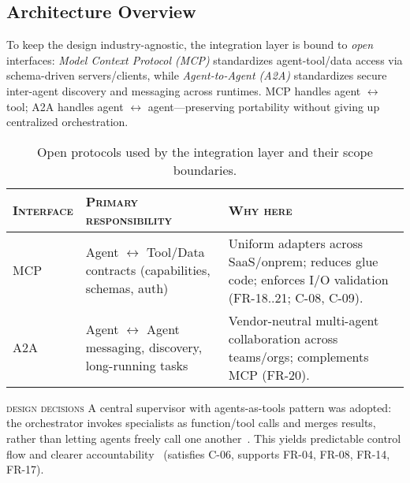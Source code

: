 \subsection{Architecture Overview}\label{sec:arch-overview}
To keep the design industry-agnostic, the integration layer is bound to \emph{open} interfaces: \emph{Model Context Protocol (MCP)} \parencite{anthropic_mcp} standardizes agent-tool/data access via schema-driven servers/clients, while \emph{Agent-to-Agent (A2A)} \parencite{google_a2a} standardizes secure inter-agent discovery and messaging across runtimes. MCP handles agent $\leftrightarrow$ tool; A2A handles agent $\leftrightarrow$ agent—preserving portability without giving up centralized orchestration.

\begin{table}[H]
  \centering
  \small
  \begin{tabular}{p{2cm} p{5.4cm} p{5.8cm}}
    \toprule
    \textsc{Interface} & \textsc{Primary responsibility} & \textsc{Why here} \\
    \midrule
    MCP & Agent $\leftrightarrow$ Tool/Data contracts (capabilities, schemas, auth) & Uniform adapters across SaaS/on\-prem; reduces glue code; enforces I/O validation (\textsc{FR-18..21; C-08, C-09}). \\
    A2A & Agent $\leftrightarrow$ Agent messaging, discovery, long-running tasks & Vendor-neutral multi-agent collaboration across teams/orgs; complements MCP (\textsc{FR-20}). \\
    \bottomrule
  \end{tabular}
  \caption{Open protocols used by the integration layer and their scope boundaries.}
\end{table}

\noindent \textsc{design decisions} \quad A central supervisor with agents-as-tools pattern was adopted: the orchestrator invokes specialists as function/tool calls and merges results, rather than letting agents freely call one another~\parencite{langchain_multi_agents}. This yields predictable control flow and clearer accountability~\parencite{cognition_dont_build} (satisfies \textsc{C-06}, supports \textsc{FR-04, FR-08, FR-14, FR-17}).

